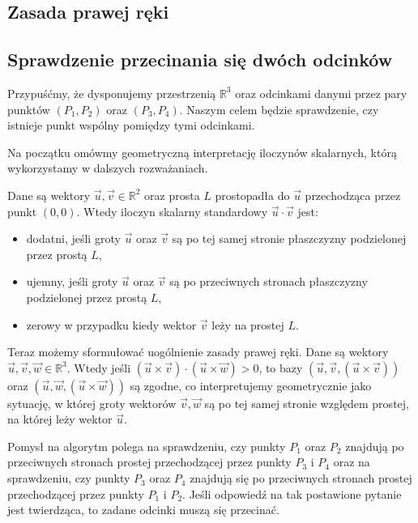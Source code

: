 \subsection{Zasada prawej ręki}

\subsection{Sprawdzenie przecinania się dwóch odcinków}
Przypuśćmy, że dysponujemy przestrzenią $\mathbb{R}^3$ oraz odcinkami danymi przez pary punktów 
$(P_1, P_2)$ oraz $(P_3, P_4)$. Naszym celem będzie sprawdzenie,
czy istnieje punkt wspólny pomiędzy tymi odcinkami.

Na początku omówmy geometryczną interpretację iloczynów skalarnych, którą wykorzystamy w dalszych rozważaniach.

Dane są wektory $\vec{u},\vec{v} \in \mathbb{R}^2$ oraz prosta $L$ prostopadła
do $\vec{u}$ przechodząca przez punkt $(0,0)$. Wtedy iloczyn skalarny 
standardowy $\vec{u} \cdot \vec{v}$
jest:
\begin{itemize}[]
	\item dodatni, jeśli groty $\vec{u}$ oraz $\vec{v}$ są po tej samej stronie płaszczyzny podzielonej przez prostą $L$,
	\item ujemny, jeśli groty $\vec{u}$ oraz $\vec{v}$ są po  przeciwnych stronach płaszczyzny podzielonej przez prostą $L$,
	\item zerowy w przypadku kiedy wektor $\vec{v}$
	leży na prostej $L$.
\end{itemize}

Teraz możemy sformułować uogólnienie zasady prawej ręki.
Dane są wektory $\vec{u},\vec{v},\vec{w} \in \mathbb{R}^3$.
Wtedy jeśli $(\vec{u} \times \vec{v})
\cdot (\vec{u} \times \vec{w}) > 0$, to bazy
$(\vec{u}, \vec{v},  (\vec{u} \times \vec{v}))$ oraz
$(\vec{u}, \vec{w},  (\vec{u} \times \vec{w}))$ są zgodne,
co interpretujemy geometrycznie jako sytuację, w której 
groty wektorów 
$\vec{v}, \vec{w}$ są po tej samej stronie względem prostej,
na której leży wektor $\vec{u}$.


Pomysł na algorytm polega na sprawdzeniu, czy punkty $P_1$
oraz $P_2$ znajdują po przeciwnych stronach prostej 
przechodzącej przez punkty $P_3$ i $P_4$ oraz 
na sprawdzeniu, czy punkty $P_3$
oraz $P_4$ znajdują się po przeciwnych stronach prostej 
przechodzącej przez punkty $P_1$ i $P_2$. Jeśli odpowiedź
na tak postawione pytanie jest twierdząca, to zadane
odcinki muszą się przecinać.


